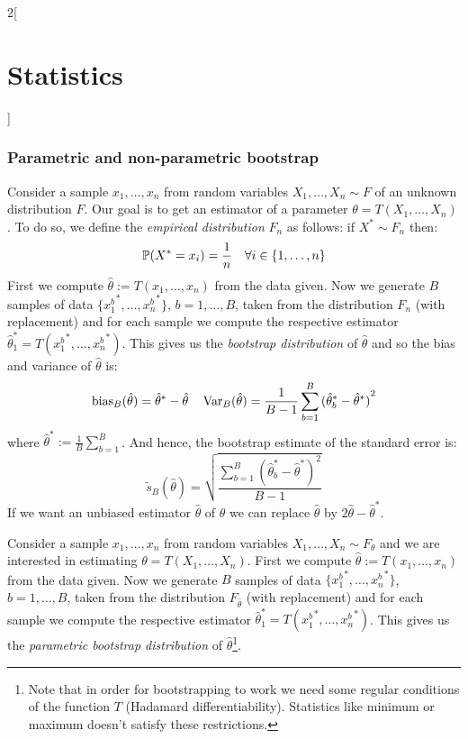 \documentclass[../../../main.tex]{subfiles}
\begin{document}
\begin{multicols}{2}[\section{Statistics}]
  \subsubsection{Parametric and non-parametric bootstrap}
  \begin{definition}
    Consider a sample $x_1,\ldots,x_n$ from \iid random variables $X_1,\ldots,X_n\sim F$ of an unknown distribution $F$. Our goal is to get an estimator of a parameter $\theta=T(X_1,\ldots,X_n)$. To do so, we define the \emph{empirical distribution} $F_n$ as follows: if $X^*\sim F_n$ then: $$\mathbb{P}(X^*=x_i)=\frac{1}{n}\quad\forall i\in\{1,\ldots,n\}$$ First we compute ${\hat\theta}:=T(x_1,\ldots,x_n)$ from the data given.
    Now we generate $B$ samples of data $\{{x_1^b}^*,\ldots,{x_n^b}^*\}$, $b=1,\ldots,B$, taken from the distribution $F_n$ (with replacement) and for each sample we compute the respective estimator ${\hat\theta}_1^*=T({x_1^b}^*,\ldots,{x_n^b}^*)$. This gives us the \emph{bootstrap distribution} of ${\hat\theta}$ and so the bias and variance of ${\hat\theta}$ is:
    $$\operatorname{bias}_B({\hat\theta})={\hat\theta}^*-{\hat\theta}\quad\operatorname{Var}_B({\hat\theta})=\frac{1}{B-1}\sum_{b=1}^B{({\hat\theta}_b^*-{\hat\theta}^*)}^2$$
    where ${\hat\theta}^*:=\frac{1}{B}\sum_{b=1}^B$. And hence, the bootstrap estimate of the standard error is:
    $$\tilde{s}_B(\hat\theta)=\sqrt{\frac{\sum_{b=1}^B{({\hat\theta}_b^*-{\hat\theta}^*)}^2}{B-1}}$$
    If we want an unbiased estimator ${\hat\theta}$ of $\theta$ we can replace ${\hat\theta}$ by $2{\hat\theta}-{\hat\theta}^*$.
  \end{definition}
  \begin{definition}
    Consider a sample $x_1,\ldots,x_n$ from \iid random variables $X_1,\ldots,X_n\sim F_{\theta}$ and we are interested in estimating $\theta=T(X_1,\ldots,X_n)$. First we compute ${\hat\theta}:=T(x_1,\ldots,x_n)$ from the data given.
    Now we generate $B$ samples of data $\{{x_1^b}^*,\ldots,{x_n^b}^*\}$, $b=1,\ldots,B$, taken from the distribution $F_{{\hat\theta}}$ (with replacement) and for each sample we compute the respective estimator ${\hat\theta}_1^*=T({x_1^b}^*,\ldots,{x_n^b}^*)$. This gives us the \emph{parametric bootstrap distribution} of ${\hat\theta}$\footnote{Note that in order for bootstrapping to work we need some regular conditions of the function $T$ (Hadamard differentiability). Statistics like minimum or maximum doesn't satisfy these restrictions.}.
  \end{definition}

\end{multicols}
\end{document}
